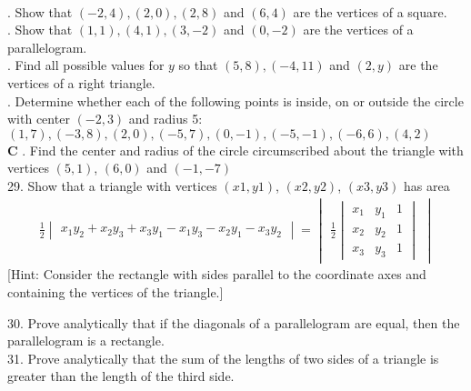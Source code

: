 \documentclass[10pt,letterpaper]{article}
\begin{document}
\\
. Show that $(-2,4), (2,0), (2,8)$ and $(6,4)$ are the vertices of a square.\\
. Show that $(1,1), (4,1), (3,-2)$ and $(0,-2)$ are the vertices of a parallelogram.\\
. Find all possible values for $y$ so that $(5,8), (-4,11)$ and $(2,y)$ are the vertices of a right triangle.\\
. Determine whether each of the following points is inside, on or outside the circle with center $(-2, 3)$ and radius 5: $(1,7), (-3,8), (2,0), (-5,7), (0,-1), (-5,-1), (-6,6), (4,2)$\\
\newline \textbf{C}
. Find the center and radius of the circle circumscribed about the triangle with vertices $(5,1)$, $(6,0)$ and $(-1, -7)$\\
29. Show that a triangle with vertices $(x1, y1)$, $(x2,y2)$, $(x3, y3)$ has area 
\begin{align}
\frac{1}{2}
\begin{vmatrix}
 x_1y_2 +x_2y_3 +x_3y_1 - x_1y_3 -x_2y_1 -x_3y_2
\end{vmatrix}
 = 
 \begin{vmatrix}
 \frac{1}{2}
 \begin{vmatrix}
 x_1 & y_1 & 1\\
 x_2 & y_2 & 1\\
 x_3 & y_3 & 1
 \end{vmatrix}
 \end{vmatrix}
\end{align}
[Hint: Consider the rectangle with sides parallel to the coordinate axes and containing the vertices of the triangle.]

30. Prove analytically that if the diagonals of a parallelogram are equal, then the parallelogram is a rectangle.\\
[Hint: Place the axes as shown in fig 1.10 and show that $\overflow{AC} = \overflow{BD}$ implies that $A$ is the origin]

31. Prove analytically that the sum of the lengths of two sides of a triangle is greater than the length of the third side.




\end{document}
